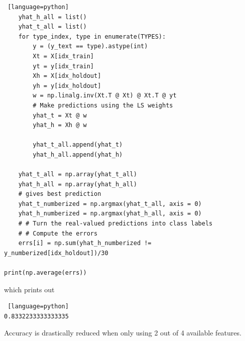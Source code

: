 \documentclass[a4paper, 12pt]{article}
\begin{document}
\begin{solution}
\begin{lstlisting} [language=python]
    yhat_h_all = list()
    yhat_t_all = list()
    for type_index, type in enumerate(TYPES):
        y = (y_text == type).astype(int)
        Xt = X[idx_train]
        yt = y[idx_train]
        Xh = X[idx_holdout]
        yh = y[idx_holdout]
        w = np.linalg.inv(Xt.T @ Xt) @ Xt.T @ yt
        # Make predictions using the LS weights
        yhat_t = Xt @ w
        yhat_h = Xh @ w
        
        yhat_t_all.append(yhat_t)
        yhat_h_all.append(yhat_h)
    
    yhat_t_all = np.array(yhat_t_all)
    yhat_h_all = np.array(yhat_h_all)
    # gives best prediction
    yhat_t_numberized = np.argmax(yhat_t_all, axis = 0)
    yhat_h_numberized = np.argmax(yhat_h_all, axis = 0)
    # # Turn the real-valued predictions into class labels
    # # Compute the errors
    errs[i] = np.sum(yhat_h_numberized != y_numberized[idx_holdout])/30

print(np.average(errs))
\end{lstlisting}
which prints out
\begin{lstlisting} [language=python]
0.8332233333333335
\end{lstlisting}
Accuracy is drastically reduced when only using 2 out of 4 available features.
\end{solution}
\end{document}
